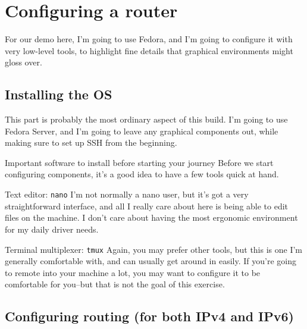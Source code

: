 \documentclass[bigger]{beamer}
\begin{document}
\section{Configuring a router}
\label{sec:org2055775}
For our demo here, I'm going to use Fedora, and I'm going to configure it with
very low-level tools, to highlight fine details that graphical environments
might gloss over.

\subsection{Installing the OS}
\label{sec:orgfdf5a5f}
This part is probably the most ordinary aspect of this build. I'm going to use
Fedora Server, and I'm going to leave any graphical components out, while
making sure to set up SSH from the beginning.

\begin{frame}[fragile,label={sec:org98c7403}]{Important software to install before starting your journey}
 Before we start configuring components, it's a good idea to have a few tools
quick at hand.

\begin{block}{Text editor: \texttt{nano}}
I'm not normally a nano user, but it's got a very straightforward interface, and
all I really care about here is being able to edit files on the machine. I don't
care about having the most ergonomic environment for my daily driver needs.
\end{block}

\begin{block}{Terminal multiplexer: \texttt{tmux}}
Again, you may prefer other tools, but this is one I'm generally comfortable
with, and can usually get around in easily. If you're going to remote into your
machine a lot, you may want to configure it to be comfortable for you--but that
is not the goal of this exercise.
\end{block}
\end{frame}

\subsection{Configuring routing (for both IPv4 and IPv6)}
\label{sec:org5b3a27e}
\end{document}
